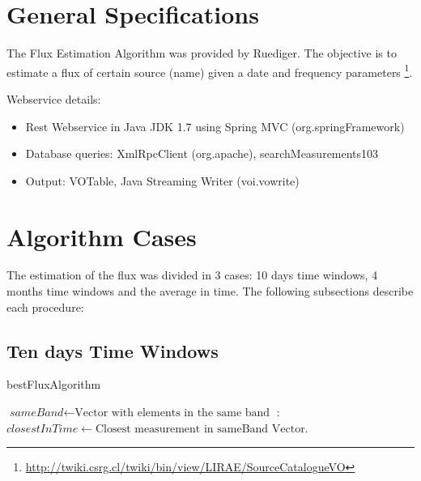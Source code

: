 \documentclass[10pt]{article}
\title{
\center{\emph{Flux Estimation Algorithm} \\}
\author{
        Ruediger Kneissl, Jonathan Antognini\\
}}
\begin{document}
\maketitle

\tableofcontents

\section{General Specifications}

The Flux Estimation Algorithm was provided by Ruediger. The objective is to estimate
a flux of certain source (name) given a date and frequency parameters
\footnote{\url{http://twiki.csrg.cl/twiki/bin/view/LIRAE/SourceCatalogueVO}}.

Webservice details:
\begin{itemize}
 \item Rest Webservice in Java JDK 1.7 using Spring MVC (org.springFramework)
 \item Database queries: XmlRpcClient (org.apache), searchMeasurements103
 \item Output: VOTable, Java Streaming Writer (voi.vowrite)
\end{itemize}

\section{Algorithm Cases}

The estimation of the flux was divided in 3 cases: 10 days time windows, 4
months time windows and the average in time. The following subsections describe
each procedure:

\subsection{Ten days Time Windows}
\begin{algorithm}
\caption{bestFluxAlgorithm}\label{10days}
\begin{algorithmic}[1]
\State $\textit{sameBand} \gets \text{Vector with elements in the same band}$
: 
\State $closestInTime \gets \text{Closest measurement in sameBand Vector}$.
\Statex
\State {}
\Else
\State {}
\EndIf
\EndProcedure
\end{algorithmic}
\end{algorithm}
\end{document}
